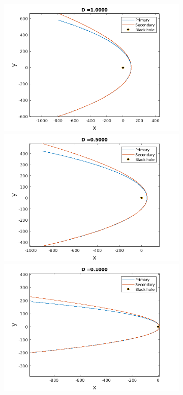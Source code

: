 \documentclass[a4paper]{article}
\begin{document}
\begin{enumerate} [label*=\textbf{(\alph*)}]
\begin{figure} [h]
					\begin{subfigure} {.425\linewidth}
						\includegraphics[width=\linewidth, height =.55\linewidth] {../plots/3f/prograde_orbits/6.png}\\
						\includegraphics[width=\linewidth, height =.55\linewidth] {../plots/3f/prograde_orbits/5.png}\\
						\includegraphics[width=\linewidth, height =.55\linewidth] {../plots/3f/prograde_orbits/4.png}\\

\end{subfigure}
\end{figure}
\end{enumerate}
\end{document}
